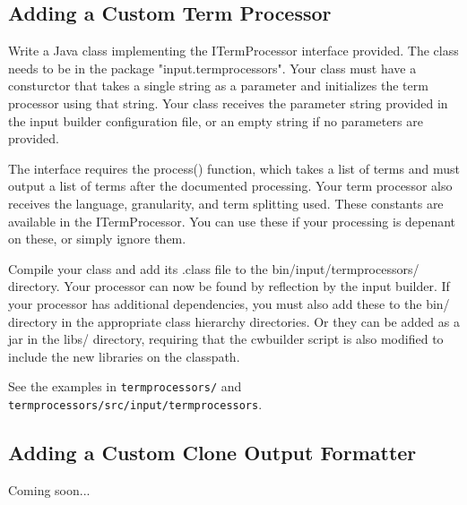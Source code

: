 \documentclass[]{article}
\begin{document}
	\subsection{Adding a Custom Term Processor}
	Write a Java class implementing the ITermProcessor interface provided. The class needs to be in the package "input.termprocessors".  Your class must have a consturctor that takes a single string as a parameter and initializes the term processor using that string.  Your class receives the parameter string provided in the input builder configuration file, or an empty string if no parameters are provided.
	
	The interface requires the process() function, which takes a list of terms and must output a list of terms after the documented processing.  Your term processor also receives the language, granularity, and term splitting used.  These constants are available in the ITermProcessor.  You can use these if your processing is depenant on these, or simply ignore them.
	
	Compile your class and add its .class file to the bin/input/termprocessors/ directory. Your processor can now be found by reflection by the input builder.  If your processor has additional dependencies, you must also add these to the bin/ directory in the appropriate class hierarchy directories.  Or they can be added as a jar in the libs/ directory, requiring that the cwbuilder script is also modified to include the new libraries on the classpath.
	
	See the examples in \verb|termprocessors/| and \verb|termprocessors/src/input/termprocessors|.
	
	
	\subsection{Adding a Custom Clone Output Formatter} \label{custom_formatter}
	Coming soon...
	
\end{document}

